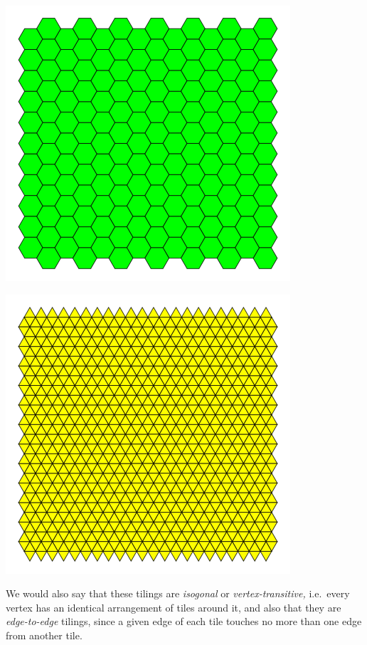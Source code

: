 \documentclass[1opt,a4paper]{article}
\begin{document}
\begin{multicols}{2}
\includegraphics[width=\linewidth]{image_1.png}

\includegraphics[width=\linewidth]{image_2.png}

We would also say that these tilings are \emph{isogonal }or
\emph{vertex-transitive, }i.e.~every vertex has an identical arrangement
of tiles around it, and also that they are \emph{edge-to-edge }tilings,
since a given edge of each tile touches no more than one edge from
another tile.


\end{multicols}
\end{document}
